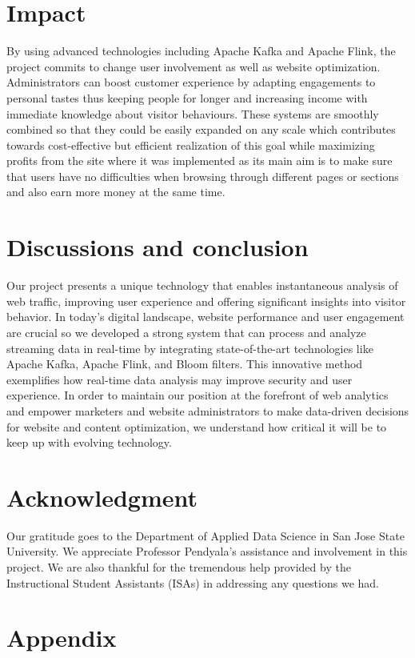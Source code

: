 \documentclass[conference]{IEEEtran}
\begin{document}
\section{Impact}
By using advanced technologies including Apache Kafka and Apache Flink, the project commits to change user involvement as well as website optimization. Administrators can boost customer experience by adapting engagements to personal tastes thus keeping people for longer and increasing income with immediate knowledge about visitor behaviours. These systems are smoothly combined so that they could be easily expanded on any scale which contributes towards cost-effective but efficient realization of this goal while maximizing profits from the site where it was implemented as its main aim is to make sure that users have no difficulties when browsing through different pages or sections and also earn more money at the same time.

\section{Discussions and conclusion}
Our project presents a unique technology that enables instantaneous analysis of web traffic, improving user experience and offering significant insights into visitor behavior. In today's digital landscape, website performance and user engagement are crucial so we developed a strong system that can process and analyze streaming data in real-time by integrating state-of-the-art technologies like Apache Kafka, Apache Flink, and Bloom filters. This innovative method exemplifies how real-time data analysis may improve security and user experience. In order to maintain our position at the forefront of web analytics and empower marketers and website administrators to make data-driven decisions for website and content optimization, we understand how critical it will be to keep up with evolving technology.

\section*{Acknowledgment}

Our gratitude goes to the Department of Applied Data Science in San Jose State University. We appreciate Professor Pendyala’s assistance and involvement in this project. We are also thankful for the tremendous help provided by the Instructional Student Assistants (ISAs) in addressing any questions we had.

\appendix
\section{Appendix}
\end{document}

